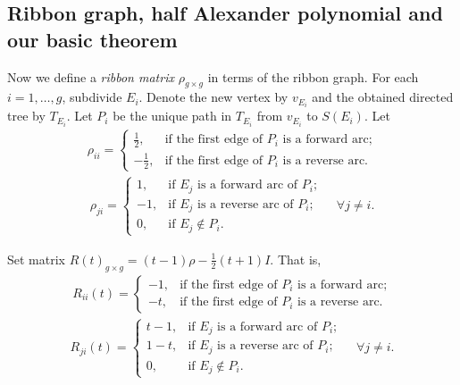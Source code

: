 \documentclass[10pt,a4paper]{amsart}
\begin{document}
\subsection{Ribbon graph, half Alexander polynomial and our basic theorem}\label{subsect:halfalexpoly}

Now we define a \textit{ribbon matrix} $\rho_{g \times g}$ in terms of the ribbon graph. For each $i = 1, \dots, g$, subdivide $E_i$. Denote the new vertex by $v_{E_i}$ and the obtained directed tree by $T_{E_i}$. Let $P_i$ be the unique path in $T_{E_i}$ from $v_{E_i}$ to $S(E_i)$. Let
\begin{align}
    \rho_{ii} = 
\begin{cases}
\frac{1}{2}, & \text{if the first edge of } P_i \text{ is a forward arc;} \\
-\frac{1}{2}, & \text{if the first edge of } P_i \text{ is a reverse arc.}
\end{cases}
\end{align}
\begin{align}
\rho_{ji} = 
\begin{cases}
1, & \text{if } E_j \text{ is a forward arc of } P_i; \\
-1, & \text{if } E_j \text{ is a reverse arc of } P_i; \\
0, & \text{if } E_j \notin P_i.
\end{cases}
\quad \forall j \neq i. \nonumber
\end{align}\label{for:ribbon matrix rho}

Set matrix $R(t)_{g \times g} = (t - 1)\rho - \frac{1}{2}(t + 1)I$. That is,
\begin{align}
    R_{ii}(t) = 
\begin{cases}
-1, & \text{if the first edge of } P_i \text{ is a forward arc;} \\
-t, & \text{if the first edge of } P_i \text{ is a reverse arc.}
\end{cases}
\end{align}
\begin{align}
    R_{ji}(t) = 
\begin{cases}
t - 1, & \text{if } E_j \text{ is a forward arc of } P_i; \\
1 - t, & \text{if } E_j \text{ is a reverse arc of } P_i; \\
0, & \text{if } E_j \notin P_i.
\end{cases}
\quad \forall j \neq i. \nonumber
\end{align}\label{for:matrix R(t)}
\end{document}
